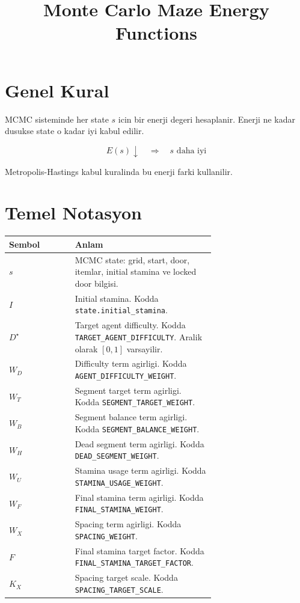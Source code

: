 \documentclass[11pt]{article}
\title{Monte Carlo Maze Energy Functions}
\author{}
\date{}
\begin{document}
\maketitle

\section{Genel Kural}

MCMC sisteminde her state $s$ icin bir enerji degeri hesaplanir.
Enerji ne kadar dusukse state o kadar iyi kabul edilir.

\[
E(s) \downarrow \quad \Longrightarrow \quad s \text{ daha iyi}
\]

Metropolis-Hastings kabul kuralinda bu enerji farki kullanilir.

\section{Temel Notasyon}

\begin{tabular}{|l|p{0.68\linewidth}|}
\hline
Sembol & Anlam \\
\hline
$s$ & MCMC state: grid, start, door, itemlar, initial stamina ve locked door bilgisi. \\
\hline
$I$ & Initial stamina. Kodda \texttt{state.initial\_stamina}. \\
\hline
$D^\star$ & Target agent difficulty. Kodda \texttt{TARGET\_AGENT\_DIFFICULTY}. Aralik olarak $[0,1]$ varsayilir. \\
\hline
$W_D$ & Difficulty term agirligi. Kodda \texttt{AGENT\_DIFFICULTY\_WEIGHT}. \\
\hline
$W_T$ & Segment target term agirligi. Kodda \texttt{SEGMENT\_TARGET\_WEIGHT}. \\
\hline
$W_B$ & Segment balance term agirligi. Kodda \texttt{SEGMENT\_BALANCE\_WEIGHT}. \\
\hline
$W_H$ & Dead segment term agirligi. Kodda \texttt{DEAD\_SEGMENT\_WEIGHT}. \\
\hline
$W_U$ & Stamina usage term agirligi. Kodda \texttt{STAMINA\_USAGE\_WEIGHT}. \\
\hline
$W_F$ & Final stamina term agirligi. Kodda \texttt{FINAL\_STAMINA\_WEIGHT}. \\
\hline
$W_X$ & Spacing term agirligi. Kodda \texttt{SPACING\_WEIGHT}. \\
\hline
$F$ & Final stamina target factor. Kodda \texttt{FINAL\_STAMINA\_TARGET\_FACTOR}. \\
\hline
$K_X$ & Spacing target scale. Kodda \texttt{SPACING\_TARGET\_SCALE}. \\
\hline
\end{tabular}
\end{document}
